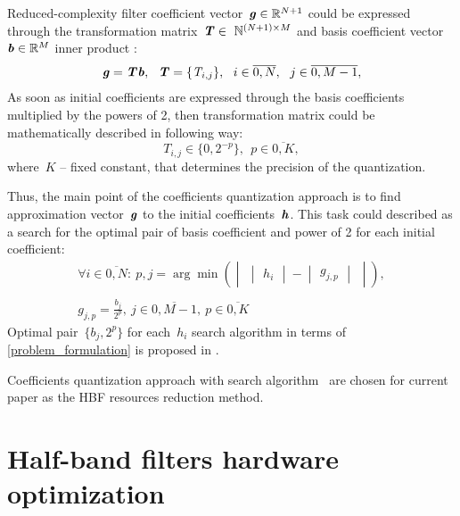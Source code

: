 \documentclass[conference]{IEEEtran}
\newcommand{\bit}[1]{\ensuremath{\textbf{\textit{#1}}}}
\begin{document}
	Reduced-complexity filter coefficient vector~$\bit{g}\in\mathbb{R}^{N+1}$ could be expressed through the transformation matrix~$\bit{T}\in~\mathbb{N}^{(N+1)\times M}$ and basis coefficient vector~$\bit{b}\in\mathbb{R}^{M}$ inner product \cite{fir_quant}:
	\begin{equation}
		\bit{g}=\bit{T}\bit{b}, \ \ \bit{T}=\{\textit{T}_{i,j}\}, \ \ i\in\overline{0,N},  \ \ j\in\overline{0,M-1},
		\label{reduced_filter_vector}
	\end{equation}
	As soon as initial coefficients are expressed through the basis coefficients multiplied by the powers of 2, then transformation matrix could be mathematically described in following way:
	\begin{equation}
		\textit{T}_{i,j}\in \{0, 2^{-p}\}, \ \ p\in \overline{0,K},
		\label{transform_matrix}
	\end{equation}
	where~$K$ -- fixed constant, that determines the precision of the quantization.
	
	Thus, the main point of the coefficients quantization approach is to find approximation vector~$\bit{g}$ to the initial coefficients~$\bit{h}$. This task could described as a search for the optimal pair of basis coefficient and power of 2 for each initial coefficient:
	\begin{equation}
		\begin{matrix}
			\forall i\in\overline{0,N}: \ p, j=\arg\min \left(\begin{vmatrix}\begin{vmatrix}h_{i}\end{vmatrix}-\begin{vmatrix}g_{j,p}\end{vmatrix}\end{vmatrix} \right), \\ \\
			g_{j,p}=\displaystyle{\frac{b_{j}}{2^{p}}}, \ j\in\overline{0,M-1}, \ p\in \overline{0,K}
		\end{matrix}
		\label{problem_formulation}
	\end{equation}
	Optimal pair~$\{b_j, 2^p\}$ for each~$h_i$ search algorithm in terms of \eqref{problem_formulation} is proposed in \cite{fir_quant}. 
	
	Coefficients quantization approach with search algorithm~\cite{fir_quant} are chosen for current paper as the HBF resources reduction method.
	
	\section{Half-band filters hardware optimization} \label{hbf_research}
\end{document}
